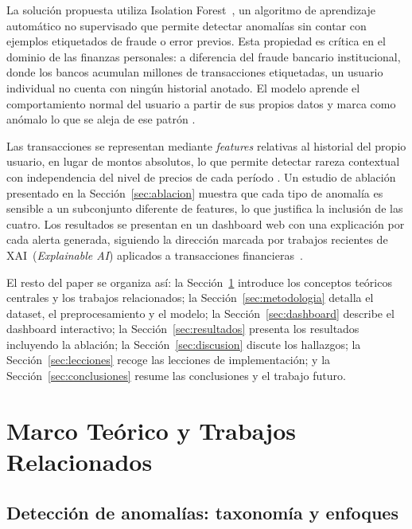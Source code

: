 \documentclass[conference]{IEEEtran}
\begin{document}
La soluci\'on propuesta utiliza Isolation Forest~\cite{liu2008isolation}, un algoritmo
de aprendizaje autom\'atico no supervisado que permite detectar anomal\'ias sin contar
con ejemplos etiquetados de fraude o error previos. Esta propiedad es cr\'itica en el
dominio de las finanzas personales: a diferencia del fraude bancario institucional,
donde los bancos acumulan millones de transacciones etiquetadas, un usuario individual
no cuenta con ning\'un historial anotado. El modelo aprende el comportamiento normal
del usuario a partir de sus propios datos y marca como an\'omalo lo que se aleja de
ese patr\'on \cite{chandola2009anomaly}.

Las transacciones se representan mediante \emph{features} relativas al historial del
propio usuario, en lugar de montos absolutos, lo que permite detectar rareza contextual
con independencia del nivel de precios de cada per\'iodo \cite{budgeting2025ml}.
Un estudio de ablaci\'on presentado en la Secci\'on~\ref{sec:ablacion} muestra
que cada tipo de anomal\'ia es sensible a un subconjunto diferente de features,
lo que justifica la inclusi\'on de las cuatro. Los resultados se presentan en un
dashboard web con una explicaci\'on por cada alerta generada, siguiendo la direcci\'on
marcada por trabajos recientes de XAI~(\emph{Explainable AI}) aplicados a
transacciones financieras~\cite{lodhi2026explainable}.

El resto del paper se organiza as\'i: la Secci\'on~\ref{sec:marco-teorico} introduce
los conceptos te\'oricos centrales y los trabajos relacionados;
la Secci\'on~\ref{sec:metodologia} detalla el dataset, el preprocesamiento y el modelo;
la Secci\'on~\ref{sec:dashboard} describe el dashboard interactivo;
la Secci\'on~\ref{sec:resultados} presenta los resultados incluyendo la ablaci\'on;
la Secci\'on~\ref{sec:discusion} discute los hallazgos;
la Secci\'on~\ref{sec:lecciones} recoge las lecciones de implementaci\'on; y
la Secci\'on~\ref{sec:conclusiones} resume las conclusiones y el trabajo futuro.

\section{Marco Te\'orico y Trabajos Relacionados}
\label{sec:marco-teorico}

\subsection{Detecci\'on de anomal\'ias: taxonom\'ia y enfoques}
\end{document}
